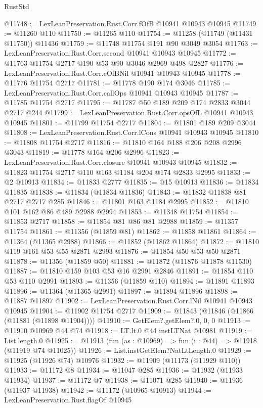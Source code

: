 \begin{lexlean}{RustStd}
\begin{coremodule}
{\begin{coremodule}
{{{{{{{{{{{{{{{{{{{{{{{{{{{{{{{{{@11748 := LexLeanPreservation.Rust.Corr.fOfB @10941 @10943 @10945
@11749 := @11260 @110
@11750 := @11265 @110
@11754 := @11258 (@11749 (@11431 @11750)) @11436
@11759 := @11748 @11754 @191 @90 @3049 @3054
@11763 := LexLeanPreservation.Rust.Corr.second @10941 @10943 @10945
@11772 := @11763 @11754 @2717 @190 @53 @90 @3046 @2969 @498 @2827
@11776 := LexLeanPreservation.Rust.Corr.eOfBNil @10941 @10943 @10945
@11778 := @11776 @11754 @2717
@11781 := @11778 @190 @174 @3046
@11785 := LexLeanPreservation.Rust.Corr.callOps @10941 @10943 @10945
@11787 := @11785 @11754 @2717
@11795 := @11787 @50 @189 @209 @174 @2833 @3044 @2717 @244
@11799 := LexLeanPreservation.Rust.Corr.opsOfL @10941 @10943 @10945
@11801 := @11799 @11754 @2717
@11804 := @11801 @189 @209 @3044
@11808 := LexLeanPreservation.Rust.Corr.lCons @10941 @10943 @10945
@11810 := @11808 @11754 @2717
@11816 := @11810 @164 @188 @206 @208 @2996 @3043
@11819 := @11778 @164 @206 @2996
@11823 := LexLeanPreservation.Rust.Corr.closure @10941 @10943 @10945
@11832 := @11823 @11754 @2717 @110 @163 @1184 @204 @174 @2833 @2995
@11833 := @2 @10913
@11834 := @11833 @2777
@11835 := @15 @10913
@11836 := @11834 @11835
@11838 := @11834 (@11834 @11836)
@11843 := @11832 @11838 @81 @2717 @2717 @285
@11846 := @11801 @163 @1184 @2995
@11852 := @11810 @101 @162 @86 @489 @2988 @2994
@11853 := @11348 @11754
@11854 := @11853 @2717
@11858 := @11854 @81 @86 @81 @2988
@11859 := @11357 @11754
@11861 := @11356 (@11859 @81)
@11862 := @11858 @11861
@11864 := @11364 (@11365 @2988)
@11866 := @11852 (@11862 @11864)
@11872 := @11810 @119 @161 @53 @55 @2871 @2993
@11876 := @11854 @50 @53 @50 @2871
@11878 := @11356 (@11859 @50)
@11881 := @11872 (@11876 @11878 @11530)
@11887 := @11810 @159 @103 @53 @16 @2991 @2846
@11891 := @11854 @110 @53 @110 @2991
@11893 := @11356 (@11859 @110)
@11894 := @11891 @11893
@11896 := @11364 (@11365 @2991)
@11897 := @11894 @11896
@11898 := @11887 @11897
@11902 := LexLeanPreservation.Rust.Corr.lNil @10941 @10943 @10945
@11904 := @11902 @11754 @2717
@11909 := @11843 (@11846 (@11866 (@11881 (@11898 @11904))))
@11910 := GetElem?.getElem?.{0, 0, 0}
@11913 := @11910 @10969 @44 @74
@11918 := LT.lt.{0} @44 instLTNat @10981
@11919 := List.length.{0}
@11925 := @11913 (fun (as : @10969) => fun (i : @44) => @11918 (@11919 @74 @11025))
@11926 := List.instGetElem?NatLtLength.{0}
@11929 := @11925 (@11926 @74) @10976
@11932 := @11909 (@11173 (@11929 @110))
@11933 := @11172 @8
@11934 := @11047 @285
@11936 := @11932 (@11933 @11934)
@11937 := @11172 @7
@11938 := @11071 @285
@11940 := @11936 (@11937 @11938)
@11942 := @11172 (@10965 @10913)
@11944 := LexLeanPreservation.Rust.flagOf @10945
}}}}}}}}}}}}}}}}}}}}}}}}}}}}}}}}}
\end{coremodule}}
\end{coremodule}
\end{lexlean}
